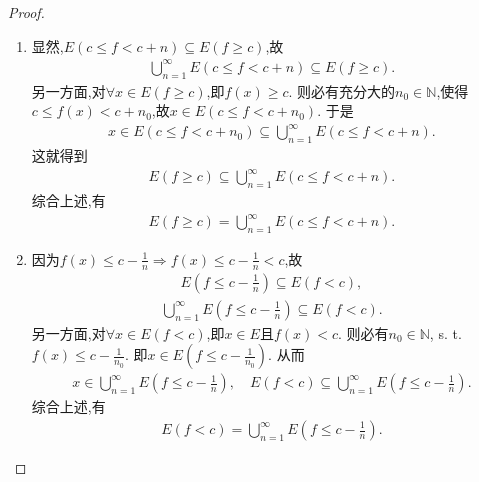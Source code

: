 \documentclass[../../main.tex]{subfiles}%
\begin{document}
\begin{proof}
\begin{enumerate}[(1)]
\item 显然,$E(c \leqslant f < c + n) \subseteq E(f \geqslant c)$,故
\begin{align*}
\bigcup_{n=1}^{\infty} E(c \leqslant f < c + n) \subseteq E(f \geqslant c).
\end{align*}
另一方面,对$\forall x \in E(f \geqslant c)$,即$f(x) \geqslant c$. 则必有充分大的$n_0 \in \mathbb{N}$,使得$c \leqslant f(x) < c + n_0$,故$x \in E(c \leqslant f < c + n_0)$. 于是
\begin{align*}
x \in E(c \leqslant f < c + n_0) \subseteq \bigcup_{n=1}^{\infty} E(c \leqslant f < c + n).
\end{align*}
这就得到
\begin{align*}
E(f \geqslant c) \subseteq \bigcup_{n=1}^{\infty} E(c \leqslant f < c + n).
\end{align*}
综合上述,有
\begin{align*}
E(f \geqslant c) = \bigcup_{n=1}^{\infty} E(c \leqslant f < c + n).
\end{align*}

\item 因为$f(x) \leqslant c - \frac{1}{n} \Rightarrow f(x) \leqslant c - \frac{1}{n} < c$,故
\begin{align*}
E\left(f \leqslant c - \frac{1}{n}\right) \subseteq E(f < c),
\end{align*}
\begin{align*}
\bigcup_{n=1}^{\infty} E\left(f \leqslant c - \frac{1}{n}\right) \subseteq E(f < c).
\end{align*}
另一方面,对$\forall x \in E(f < c)$,即$x \in E$且$f(x) < c$. 则必有$n_0 \in \mathbb{N}$, s. t. $f(x) \leqslant c - \frac{1}{n_0}$. 即$x \in E\left(f \leqslant c - \frac{1}{n_0}\right)$. 从而
\begin{align*}
x \in \bigcup_{n=1}^{\infty} E\left(f \leqslant c - \frac{1}{n}\right), \quad E(f < c) \subseteq \bigcup_{n=1}^{\infty} E\left(f \leqslant c - \frac{1}{n}\right).
\end{align*}
综合上述,有
\begin{align*}
E(f < c) = \bigcup_{n=1}^{\infty} E\left(f \leqslant c - \frac{1}{n}\right).
\end{align*}
\end{enumerate}
\end{proof}
\end{document}
